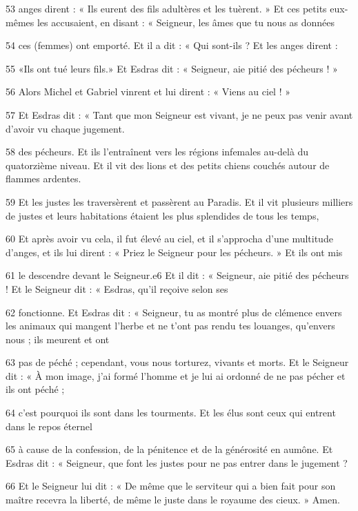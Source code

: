 \par 53 anges dirent : « Ils eurent des fils adultères et les tuèrent. » Et ces petits eux-mêmes les accusaient, en disant : « Seigneur, les âmes que tu nous as données

\par 54 ces (femmes) ont emporté. Et il a dit : « Qui sont-ils ? Et les anges dirent :

\par 55 «Ils ont tué leurs fils.» Et Esdras dit : « Seigneur, aie pitié des pécheurs ! »

\par 56 Alors Michel et Gabriel vinrent et lui dirent : « Viens au ciel ! »

\par 57 Et Esdras dit : « Tant que mon Seigneur est vivant, je ne peux pas venir avant d'avoir vu chaque jugement.

\par 58 des pécheurs. Et ils l'entraînent vers les régions infemales au-delà du quatorzième niveau. Et il vit des lions et des petits chiens couchés autour de flammes ardentes.

\par 59 Et les justes les traversèrent et passèrent au Paradis. Et il vit plusieurs milliers de justes et leurs habitations étaient les plus splendides de tous les temps,

\par 60 Et après avoir vu cela, il fut élevé au ciel, et il s'approcha d'une multitude d'anges, et ils lui dirent : « Priez le Seigneur pour les pécheurs. » Et ils ont mis

\par 61 le descendre devant le Seigneur.e6 Et il dit : « Seigneur, aie pitié des pécheurs ! Et le Seigneur dit : « Esdras, qu’il reçoive selon ses

\par 62 fonctionne. Et Esdras dit : « Seigneur, tu as montré plus de clémence envers les animaux qui mangent l'herbe et ne t'ont pas rendu tes louanges, qu'envers nous ; ils meurent et ont

\par 63 pas de péché ; cependant, vous nous torturez, vivants et morts. Et le Seigneur dit : « À mon image, j'ai formé l'homme et je lui ai ordonné de ne pas pécher et ils ont péché ;

\par 64 c'est pourquoi ils sont dans les tourments. Et les élus sont ceux qui entrent dans le repos éternel

\par 65 à cause de la confession, de la pénitence et de la générosité en aumône. Et Esdras dit : « Seigneur, que font les justes pour ne pas entrer dans le jugement ?

\par 66 Et le Seigneur lui dit : « De même que le serviteur qui a bien fait pour son maître recevra la liberté, de même le juste dans le royaume des cieux. » Amen.

